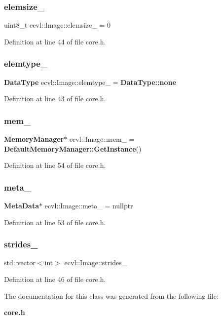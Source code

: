 \subsubsection{elemsize\_}
{\footnotesize\ttfamily uint8\+\_\+t ecvl\+::\+Image\+::elemsize\+\_\+ = 0}



Definition at line 44 of file core.\+h.

\mbox{\label{classecvl_1_1_image_a78886ac222536f1d6e8e83d868482b5a}} 
\subsubsection{elemtype\_}
{\footnotesize\ttfamily \textbf{ Data\+Type} ecvl\+::\+Image\+::elemtype\+\_\+ = \textbf{ Data\+Type\+::none}}



Definition at line 43 of file core.\+h.

\mbox{\label{classecvl_1_1_image_a47c93cfe9efa12b380cc00cad3fb3d12}} 
\subsubsection{mem\_}
{\footnotesize\ttfamily \textbf{ Memory\+Manager}$\ast$ ecvl\+::\+Image\+::mem\+\_\+ = \textbf{ Default\+Memory\+Manager\+::\+Get\+Instance}()}



Definition at line 54 of file core.\+h.

\mbox{\label{classecvl_1_1_image_a32383ca82c257c20e22b4587965d4566}} 
\subsubsection{meta\_}
{\footnotesize\ttfamily \textbf{ Meta\+Data}$\ast$ ecvl\+::\+Image\+::meta\+\_\+ = nullptr}



Definition at line 53 of file core.\+h.

\mbox{\label{classecvl_1_1_image_a6a74e60fe9da7dd77117b50122d492cb}} 
\subsubsection{strides\_}
{\footnotesize\ttfamily std\+::vector$<$int$>$ ecvl\+::\+Image\+::strides\+\_\+}



Definition at line 46 of file core.\+h.



The documentation for this class was generated from the following file\+:\begin{DoxyCompactItemize}
\item 
\textbf{ core.\+h}\end{DoxyCompactItemize}
